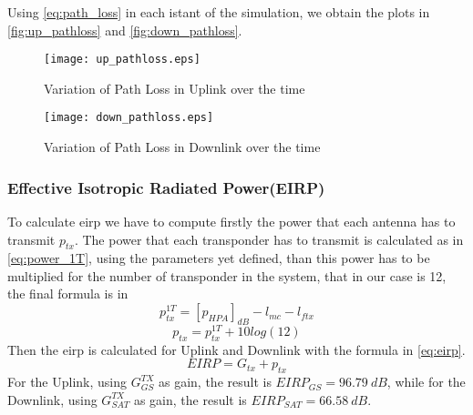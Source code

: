 		Using \autoref{eq:path_loss} in each istant of the simulation, we obtain the plots in \autoref{fig:up_pathloss} and \autoref{fig:down_pathloss}.

		\begin{figure}[ht]
			\begin{minipage}{.5\textwidth}
			\centering
			\texttt{[image: up\_pathloss.eps]}
			\caption{Variation of Path Loss in Uplink over the time}
			\label{fig:up_pathloss}
			\end{minipage}\hspace{0.5cm}
			\begin{minipage}{.5\textwidth}
			\centering
			\texttt{[image: down\_pathloss.eps]}
			\caption{Variation of Path Loss in Downlink over the time}
			\label{fig:down_pathloss}
			\end{minipage}
		\end{figure}
	\subsubsection{Effective Isotropic Radiated Power(EIRP)}
	To calculate \gls{eirp} we have to compute firstly the power that each antenna has to transmit $p_{tx}$.
	The power that each transponder has to transmit is calculated as in \autoref{eq:power_1T}, using the parameters yet defined, than this power has to be multiplied for the number of transponder in the system, that in our case is 12, the final formula is in
	\begin{equation}\label{eq:power_1T}
		p_{tx}^{1T} = [p_{HPA}]_{dB} - l_{mc} - l_{ftx}
	\end{equation}
	\begin{equation}\label{eq:power_tot}
		p_{tx} = p_{tx}^{1T} + 10log(12)
	\end{equation}
	Then the \gls{eirp} is calculated for Uplink and Downlink with the formula in \autoref{eq:eirp}.
	\begin{equation}\label{eq:eirp}
		EIRP = G_{tx} + p_{tx}
	\end{equation}
	For the Uplink, using $G_{GS}^{TX}$ as gain, the result is $EIRP_{GS} = 96.79 ~dB$, while for the Downlink, using $G_{SAT}^{TX}$ as gain, the result is $EIRP_{SAT} = 66.58 ~dB$.
